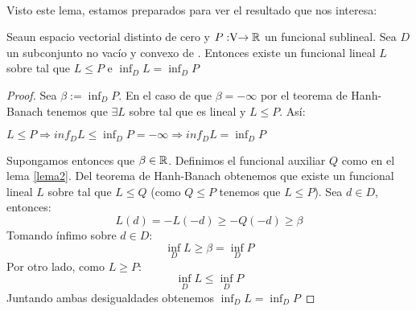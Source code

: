	\paragraph{}Visto este lema, estamos preparados para ver el resultado que nos interesa:
	
	\begin{teoremaBox}
		Sea\vecSpace un espacio vectorial distinto de cero y $P:\vecSpace \rightarrow \RR$ un funcional sublineal.  Sea $ D $ un subconjunto no vacío y convexo de \vecSpace. Entonces existe un funcional lineal $ L $ sobre \vecSpace tal que $ L \leq P $ e $ \inf_D L = \inf_D P $
	\end{teoremaBox}
	\begin{proof}
		Sea $ \beta := \inf_D P $. En el caso de que $ \beta = -\infty $ por el teorema de Hanh-Banach tenemos que $ \exists L $ sobre \vecSpace tal que es lineal y $ L \leq P$. Así:
		\begin{center}
			$ L \leq P \Longrightarrow inf_D L \leq \inf_D P = -\infty \Longrightarrow inf_D L = \inf_D P$ 
		\end{center}
		
		Supongamos entonces que $ \beta \in \mathbb{R} $. Definimos el funcional auxiliar $ Q $ como en el lema \ref{lema2}. Del teorema de Hanh-Banach obtenemos que existe un funcional lineal $ L $ sobre \vecSpace tal que $ L \leq Q$ (como $ Q \leq P $ tenemos que $ L \leq P $). Sea $ d \in D $, entonces:
		\[
		L(d) = -L(-d) \geq -Q(-d) \geq \beta
		\]
		Tomando ínfimo sobre $ d \in D $:
		\[
		\inf_D L \geq \beta = \inf_D P
		\]
		Por otro lado, como $ L \geq P $:
		\[
		\inf_D L \leq\inf_D P
		\]
		Juntando ambas desigualdades obtenemos $ \inf_D L =\inf_D P $
	\end{proof}

